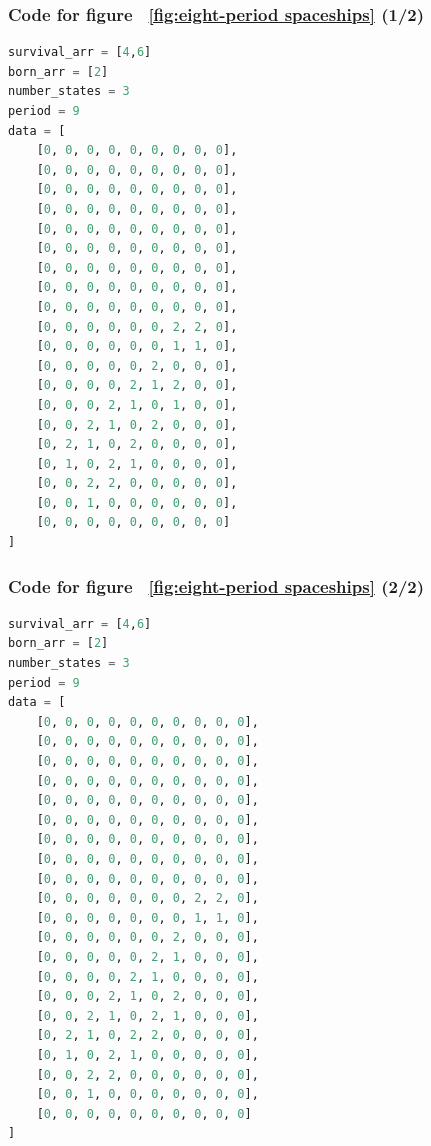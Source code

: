 \documentclass[12pt]{article}
\numberwithin{figure}{section} %
\begin{document}
\subsubsection{Code for figure ~\ref{fig:eight-period spaceships} (1/2)}
\label{subsubsection:eight-period spaceships (1/2)}
\begin{lstlisting}[language = Python]
survival_arr = [4,6]
born_arr = [2]
number_states = 3
period = 9
data = [
    [0, 0, 0, 0, 0, 0, 0, 0, 0],
    [0, 0, 0, 0, 0, 0, 0, 0, 0],
    [0, 0, 0, 0, 0, 0, 0, 0, 0],
    [0, 0, 0, 0, 0, 0, 0, 0, 0],
    [0, 0, 0, 0, 0, 0, 0, 0, 0],
    [0, 0, 0, 0, 0, 0, 0, 0, 0],
    [0, 0, 0, 0, 0, 0, 0, 0, 0],
    [0, 0, 0, 0, 0, 0, 0, 0, 0],
    [0, 0, 0, 0, 0, 0, 0, 0, 0],
    [0, 0, 0, 0, 0, 0, 2, 2, 0],
    [0, 0, 0, 0, 0, 0, 1, 1, 0],
    [0, 0, 0, 0, 0, 2, 0, 0, 0],
    [0, 0, 0, 0, 2, 1, 2, 0, 0],
    [0, 0, 0, 2, 1, 0, 1, 0, 0],
    [0, 0, 2, 1, 0, 2, 0, 0, 0],
    [0, 2, 1, 0, 2, 0, 0, 0, 0],
    [0, 1, 0, 2, 1, 0, 0, 0, 0],
    [0, 0, 2, 2, 0, 0, 0, 0, 0],
    [0, 0, 1, 0, 0, 0, 0, 0, 0],
    [0, 0, 0, 0, 0, 0, 0, 0, 0]
]

\end{lstlisting}

\subsubsection{Code for figure ~\ref{fig:eight-period spaceships} (2/2)}
\label{subsubsection:eight-period spaceships (2/2)}
\begin{lstlisting}[language = Python]
survival_arr = [4,6]
born_arr = [2]
number_states = 3
period = 9
data = [
    [0, 0, 0, 0, 0, 0, 0, 0, 0, 0],
    [0, 0, 0, 0, 0, 0, 0, 0, 0, 0],
    [0, 0, 0, 0, 0, 0, 0, 0, 0, 0],
    [0, 0, 0, 0, 0, 0, 0, 0, 0, 0],
    [0, 0, 0, 0, 0, 0, 0, 0, 0, 0],
    [0, 0, 0, 0, 0, 0, 0, 0, 0, 0],
    [0, 0, 0, 0, 0, 0, 0, 0, 0, 0],
    [0, 0, 0, 0, 0, 0, 0, 0, 0, 0],
    [0, 0, 0, 0, 0, 0, 0, 0, 0, 0],
    [0, 0, 0, 0, 0, 0, 0, 2, 2, 0],
    [0, 0, 0, 0, 0, 0, 0, 1, 1, 0],
    [0, 0, 0, 0, 0, 0, 2, 0, 0, 0],
    [0, 0, 0, 0, 0, 2, 1, 0, 0, 0],
    [0, 0, 0, 0, 2, 1, 0, 0, 0, 0],
    [0, 0, 0, 2, 1, 0, 2, 0, 0, 0],
    [0, 0, 2, 1, 0, 2, 1, 0, 0, 0],
    [0, 2, 1, 0, 2, 2, 0, 0, 0, 0],
    [0, 1, 0, 2, 1, 0, 0, 0, 0, 0],
    [0, 0, 2, 2, 0, 0, 0, 0, 0, 0],
    [0, 0, 1, 0, 0, 0, 0, 0, 0, 0],
    [0, 0, 0, 0, 0, 0, 0, 0, 0, 0]
]
\end{lstlisting}
\end{document}
